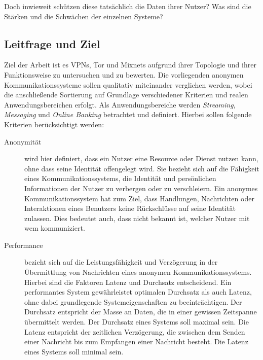 Doch inwieweit schützen diese tatsächlich die Daten ihrer Nutzer? Was sind die Stärken und die Schwächen der einzelnen Systeme?

\subsection{Leitfrage und Ziel}

Ziel der Arbeit ist es VPNs, Tor und Mixnets aufgrund ihrer Topologie und ihrer Funktionsweise zu untersuchen und zu bewerten. Die vorliegenden anonymen Kommunikationssysteme sollen qualitativ miteinander verglichen werden, wobei die anschließende Sortierung auf Grundlage verschiedener Kriterien und realen Anwendungsbereichen erfolgt. Als Anwendungsbereiche werden \textit{Streaming}, \textit{Messaging} und \textit{Online Banking} betrachtet und definiert. Hierbei sollen folgende Kriterien berücksichtigt werden:

\begin{description}
    \item[Anonymität] wird hier definiert, dass ein Nutzer eine Resource oder Dienst nutzen kann, ohne dass seine Identität offengelegt wird. Sie bezieht sich auf die Fähigkeit eines Kommunikationssystems, die Identität und persönlichen Informationen der Nutzer zu verbergen oder zu verschleiern. Ein anonymes Kommunikationssystem hat zum Ziel, dass Handlungen, Nachrichten oder Interaktionen eines Benutzers keine Rückschlüsse auf seine Identität zulassen. Dies bedeutet auch, dass nicht bekannt ist, welcher Nutzer mit wem kommuniziert\cite{DefinitionOfAnonymity}.

    \item[Performance] bezieht sich auf die Leistungsfähigkeit und Verzögerung in der Übermittlung von Nachrichten eines anonymen Kommunikationssystems. Hierbei sind die Faktoren Latenz und Durchsatz entscheidend. Ein performantes System gewährleistet optimalen Durchsatz als auch Latenz, ohne dabei grundlegende Systemeigenschaften zu beeinträchtigen. Der Durchsatz entspricht der Masse an Daten, die in einer gewissen Zeitspanne übermittelt werden. Der Durchsatz eines Systems soll maximal sein. Die Latenz entspricht der zeitlichen Verzögerung, die zwischen dem Senden einer Nachricht bis zum Empfangen einer Nachricht besteht. Die Latenz eines Systems soll minimal sein\cite{ComputerNetworkPerformanceAnalysis}.
\end{description}
